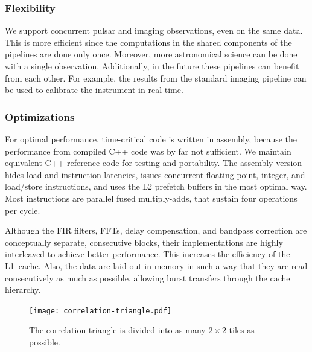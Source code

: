 \documentclass{sig-alternate}
\begin{document}
\subsubsection{Flexibility}

We support concurrent pulsar and imaging observations, even on the
same data.  This is more efficient since the
computations in the shared components of the pipelines are done only
once. Moreover, more astronomical science can be done with a
single observation.  Additionally, in the future these pipelines can
benefit from each other.  For example, the results from
the standard imaging pipeline can be used to calibrate the instrument
in real time.



\subsubsection{Optimizations}

For optimal performance, time-critical code is written in assembly,
because the performance from compiled C++ code was by far not sufficient.
We maintain equivalent C++ reference code for testing and portability.
The assembly version hides load and instruction latencies, issues concurrent
floating point, integer, and load/store instructions,
and uses the L2 prefetch buffers in the most optimal way.
Most instructions are parallel fused multiply-adds, that sustain four
operations per cycle.

Although the FIR filters, FFTs, delay compensation, and bandpass correction
are conceptually separate, consecutive blocks, their implementations are
highly interleaved to achieve better performance.
This increases the efficiency of the L1~cache.
Also, the data are laid out in memory in such a way that they are read
consecutively as much as possible, allowing burst transfers through the
cache hierarchy.

\begin{figure}[ht]
\begin{center}
\texttt{[image: correlation-triangle.pdf]}
\end{center}
\caption{The correlation triangle is divided into as many $2\times2$ tiles as possible.}
\label{fig:correlation-triangle}
\end{figure}
\end{document}
